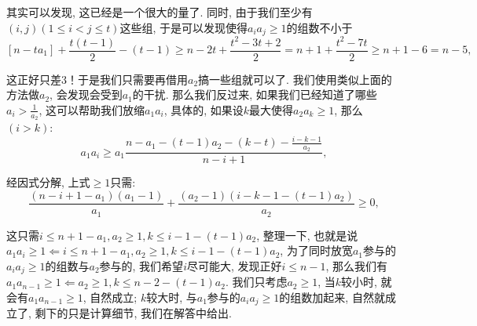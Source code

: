 \documentclass[lang=cn,12pt,thmcnt=section]{elegantbook}
\begin{document}
\begin{analysis}
其实可以发现, 这已经是一个很大的量了. 同时, 由于我们至少有$(i,j)(1\le i<j\le t)$这些组, 于是可以发现使得$a_ia_j\ge 1$的组数不小于
\[
[n-ta_1]+\frac{t(t-1)}{2}-(t-1)\ge n-2t+\frac{t^2-3t+2}{2}=n+1+\frac{t^2-7t}{2}\ge n+1-6=n-5,
\]

这正好只差$3$！于是我们只需要再借用$a_2$搞一些组就可以了. 我们使用类似上面的方法做$a_2$, 会发现会受到$a_1$的干扰. 那么我们反过来, 如果我们已经知道了哪些$a_i>\frac{1}{a_2}$, 这可以帮助我们放缩$a_1a_i$, 具体的, 如果设$k$最大使得$a_2a_k\ge 1$, 那么$(i>k)$: 
\[
a_1a_i\ge a_1\frac{n-a_1-(t-1)a_2-(k-t)-\frac{i-k-1}{a_2}}{n-i+1},
\]

经因式分解, 上式$\ge 1$只需: 
\[
\frac{(n-i+1-a_1)(a_1-1)}{a_1}+\frac{(a_2-1)(i-k-1-(t-1)a_2)}{a_2}\ge 0,
\]

这只需$i\le n+1-a_1, a_2\ge 1,k\le i-1-(t-1)a_2$, 整理一下, 也就是说$a_1a_i\ge 1\Leftarrow i\le n+1-a_1, a_2\ge 1,k\le i-1-(t-1)a_2$, 为了同时放宽$a_1$参与的$a_ia_j\ge 1$的组数与$a_2$参与的, 我们希望$i$尽可能大, 发现正好$i\le n-1$, 那么我们有$a_1a_{n-1}\ge 1\Leftarrow a_2\ge 1,k\le n-2-(t-1)a_2$. 我们只考虑$a_2\ge 1$, 当$k$较小时, 就会有$a_1a_{n-1}\ge 1$, 自然成立; $k$较大时, 与$a_1$参与的$a_ia_j\ge 1$的组数加起来, 自然就成立了, 剩下的只是计算细节, 我们在解答中给出.
\end{analysis}
\end{document}

